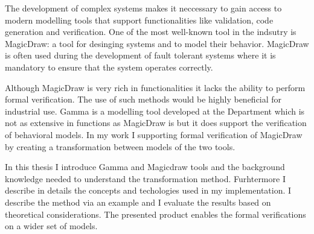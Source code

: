 The development of complex systems makes it neccessary to gain access to modern modelling tools that support functionalities like validation, code generation and verification. One of the most well-known tool in the indsutry is MagicDraw: a tool for desinging systems and to model their behavior. MagicDraw is often used during the development of fault tolerant systems where it is mandatory to ensure that the system operates correctly.

Although MagicDraw is very rich in functionalities it lacks the ability to perform formal verification. The use of such methods would be highly beneficial for industrial use. Gamma is a modelling tool developed at the Department which is not as extensive in functions as MagicDraw is but it does support the verification of behavioral models. In my work I supporting formal verification of MagicDraw by creating a transformation between models of the two tools.

In this thesis I introduce Gamma and Magicdraw tools and the background knowledge needed to understand the transformation method. Furhtermore I describe in details the concepts and techologies used in my implementation. I describe the method via an example and I evaluate the results based on theoretical considerations. The presented product enables the formal verifications on a wider set of models.


\vfill
\selectthesislanguage

\setcounter{romanPage}{\value{page}}
